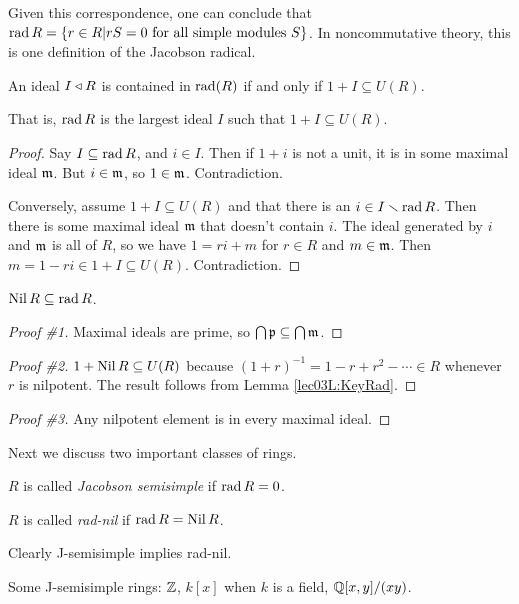  Given this correspondence, one can conclude that $\operatorname{rad} R = \{r\in R| rS=0 \text{ for all
 simple modules } S\}$. In noncommutative theory, this is one definition of the Jacobson
 radical.

 \begin{lemma}\label{lec03L:KeyRad}
   An ideal $I\triangleleft R$ is contained in $\operatorname{rad} (R)$ if and only if $1+I\subseteq U(R)$.
 \end{lemma}
 That is, $\operatorname{rad} R$ is the largest ideal $I$ such that $1+I\subseteq U(R)$.
 \begin{proof}
   Say $I\subseteq \operatorname{rad} R$, and $i\in I$. Then if $1+i$ is not a unit, it is in some
   maximal ideal $\mathfrak{m}$. But $i\in \mathfrak{m}$, so $1\in\mathfrak{m}$. Contradiction.

   Conversely, assume $1+I\subseteq U(R)$ and that there is an $i\in I\smallsetminus\operatorname{rad}
   R$. Then there is some maximal ideal $\mathfrak{m}$ that doesn't contain $i$. The ideal
   generated by $i$ and $\mathfrak{m}$ is all of $R$, so we have $1=ri+m$ for $r\in R$ and $m\in
   \mathfrak{m}$. Then $m=1-ri\in 1+I\subseteq U(R)$. Contradiction.
 \end{proof}

 \begin{lemma}
   $\operatorname{Nil} R\subseteq \operatorname{rad} R$.
 \end{lemma}
 \begin{proof}[Proof \#1]
   Maximal ideals are prime, so $\bigcap \mathfrak{p}\subseteq \bigcap \mathfrak{m}$.
 \end{proof}
 \begin{proof}[Proof \#2]
   $1+\operatorname{Nil} R\subseteq U(R)$ because $(1+r)^{-1}=1-r+r^2-\cdots \in R$ whenever $r$ is
   nilpotent. The result follows from Lemma \ref{lec03L:KeyRad}.
 \end{proof}
 \begin{proof}[Proof \#3]
   Any nilpotent element is in every maximal ideal.
 \end{proof}

 Next we discuss two important classes of rings.
 \begin{definition}
   $R$ is called \emph{Jacobson semisimple} if $\operatorname{rad} R=0$.
 \end{definition}
 \begin{definition}
   $R$ is called \emph{rad-nil} if $\operatorname{rad} R=\operatorname{Nil} R$.
 \end{definition}
 Clearly J-semisimple implies rad-nil.
 \begin{example}
   Some J-semisimple rings: $\mathbb{Z}$, $k[x]$ when $k$ is a field, $\mathbb{Q}[x,y]/(xy)$.
 \end{example}

